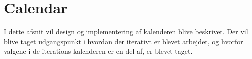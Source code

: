 \section{Calendar}

I dette afsnit vil design og implementering af kalenderen blive beskrivet. Der vil blive taget udgangspunkt i hvordan der iterativt er blevet arbejdet, og hvorfor valgene i de iterations kalenderen er en del af, er blevet taget.


